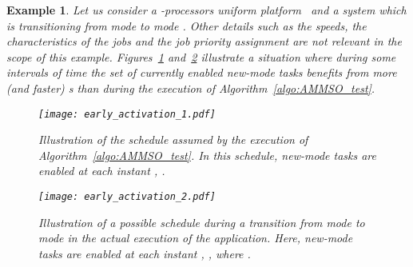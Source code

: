 \documentclass{article}
\newtheorem{validity test}{Validity Test}
\newtheorem{Example}{Example}
\begin{document}
\begin{Example}
Let us consider a -processors uniform platform~ and a system which is transitioning from mode  to mode . Other details such as the  speeds, the characteristics of the jobs and the job priority assignment are not relevant in the scope of this example. Figures~\ref{fig:Multimode:early_activation_1} and~\ref{fig:Multimode:early_activation_2} illustrate a situation where during some intervals of time the set of currently enabled new-mode tasks benefits from more (and \emph{faster}) s than during the execution of Algorithm~\ref{algo:AMMSO_test}. 
\begin{figure}[h!]
\begin{center}
\texttt{[image: early\_activation\_1.pdf]}
\caption{Illustration of the schedule assumed by the execution of Algorithm~\ref{algo:AMMSO_test}. In this schedule, new-mode tasks are enabled at each instant , .}
\label{fig:Multimode:early_activation_1}
\end{center}
\end{figure}

\begin{figure}[h!]
\begin{center}
\texttt{[image: early\_activation\_2.pdf]}
\caption{Illustration of a possible schedule during a transition from mode  to mode  in the \emph{actual} execution of the application. Here, new-mode tasks are enabled at each instant , , where .}
\label{fig:Multimode:early_activation_2}
\end{center}
\end{figure}


\end{Example}
\end{document}
